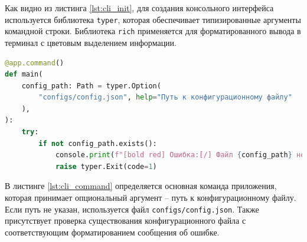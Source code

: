 Как видно из листинга \ref{lst:cli_init}, для создания консольного интерфейса используется библиотека \texttt{typer}, которая обеспечивает типизированные аргументы командной строки. Библиотека \texttt{rich} применяется для форматированного вывода в терминал с цветовым выделением информации.

\begin{lstlisting}[caption={Определение основной команды приложения}, label=lst:cli_command, language=Python]
@app.command()
def main(
	config_path: Path = typer.Option(
		"configs/config.json", help="Путь к конфигурационному файлу"
	),
):
	try:
		if not config_path.exists():
			console.print(f"[bold red] Ошибка:[/] Файл {config_path} не найден")
			raise typer.Exit(code=1)
\end{lstlisting}

В листинге \ref{lst:cli_command} определяется основная команда приложения, которая принимает опциональный аргумент -- путь к конфигурационному файлу. Если путь не указан, используется файл \texttt{configs/config.json}. Также присутствует проверка существования конфигурационного файла с соответствующим форматированием сообщения об ошибке.

\newpage


